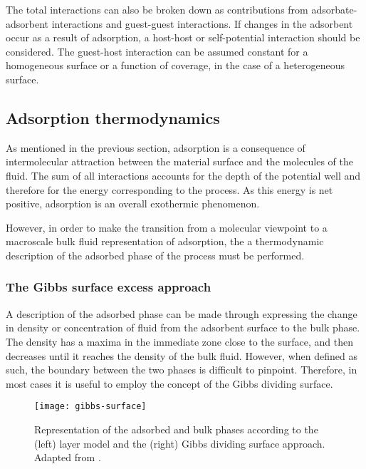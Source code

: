 The total interactions can also be broken down as contributions
from adsorbate-adsorbent interactions and guest-guest interactions.
If changes in the adsorbent occur as a result of adsorption,
a host-host or self-potential interaction should be considered.
The guest-host interaction can be assumed constant for a homogeneous
surface or a function of coverage, in the case of a
heterogeneous surface.

\subsection{Adsorption thermodynamics}

As mentioned in the previous section, adsorption
is a consequence of intermolecular attraction between the
material surface and the molecules of the fluid. The sum of
all interactions accounts for the depth of the potential
well and therefore for the energy corresponding to the
process. As this energy is net positive, adsorption is an
overall exothermic phenomenon.

However, in order to make the transition from a molecular
viewpoint to a macroscale bulk fluid representation of
adsorption, the a thermodynamic description of the adsorbed
phase of the process must be performed.

\subsubsection{The Gibbs surface excess approach}

A description of the adsorbed phase can be made through
expressing the change in density or concentration of fluid
from the adsorbent surface to the bulk phase. The density
has a maxima in the immediate zone close to the surface, and then
decreases until it reaches the density of the bulk fluid.
However, when defined as such, the boundary between the
two phases is difficult to pinpoint.
Therefore, in most cases it is useful to employ the concept
of the Gibbs dividing surface.

\begin{figure}[htb]
	\centering

	\texttt{[image: gibbs-surface]}
	\caption{
		Representation of the adsorbed and bulk phases according to
		the (left) layer model and the (right) Gibbs dividing surface
		approach. Adapted from \citeauthor{rouquerolAdsorptionPowdersPorous2013}%
		\cite{rouquerolAdsorptionPowdersPorous2013}.
	}%
	\label{calo:fig:gibbs-surface}

\end{figure}

